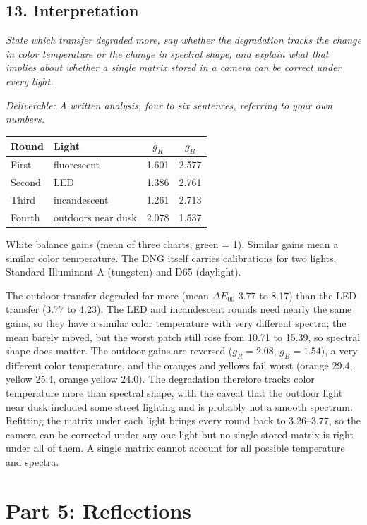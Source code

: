 \documentclass[11pt]{article}
\newcommand{\task}[3]{\subsection*{#1}{\sloppy\noindent\textit{#2}\par}\smallskip\noindent\textit{Deliverable: #3}\par\medskip}
\begin{document}
\task{13. Interpretation}
{State which transfer degraded more, say whether the degradation tracks the change in color temperature or the change in spectral shape, and explain what that implies about whether a single matrix stored in a camera can be correct under every light.}
{A written analysis, four to six sentences, referring to your own numbers.}

\begin{center}
\begin{tabular}{llcc}
\toprule
Round & Light & $g_R$ & $g_B$ \\
\midrule
First & fluorescent & 1.601 & 2.577 \\
Second & LED & 1.386 & 2.761 \\
Third & incandescent & 1.261 & 2.713 \\
Fourth & outdoors near dusk & 2.078 & 1.537 \\
\bottomrule
\end{tabular}
\end{center}
\noindent White balance gains (mean of three charts, green = 1). Similar gains mean a similar color temperature. The DNG itself carries calibrations for two lights, Standard Illuminant A (tungsten) and D65 (daylight).

The outdoor transfer degraded far more (mean $\Delta E_{00}$ 3.77 to 8.17) than the LED transfer (3.77 to 4.23). The LED and incandescent rounds need nearly the same gains, so they have a similar color temperature with very different spectra; the mean barely moved, but the worst patch still rose from 10.71 to 15.39, so spectral shape does matter. The outdoor gains are reversed ($g_R = 2.08$, $g_B = 1.54$), a very different color temperature, and the oranges and yellows fail worst (orange 29.4, yellow 25.4, orange yellow 24.0). The degradation therefore tracks color temperature more than spectral shape, with the caveat that the outdoor light near dusk included some street lighting and is probably not a smooth spectrum. Refitting the matrix under each light brings every round back to 3.26--3.77, so the camera can be corrected under any one light but no single stored matrix is right under all of them.
A single matrix cannot account for all possible temperature and spectra.

\section*{Part 5: Reflections}
\end{document}
